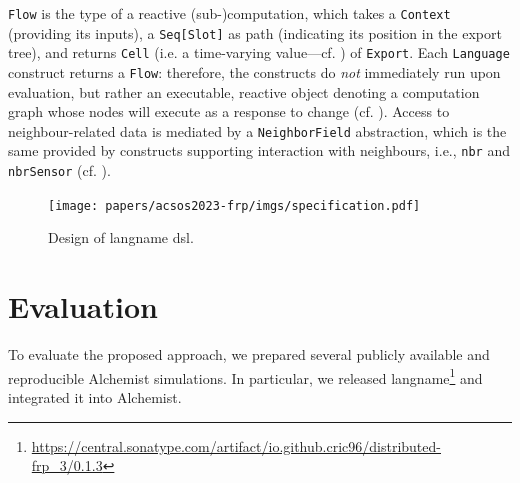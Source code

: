 \texttt{Flow} is the type 
 of a reactive \mbox{(sub-)computation},
 which takes a \texttt{Context} (providing its inputs),
 a \texttt{Seq[Slot]} as path (indicating its position in the export tree),
 and returns \texttt{Cell} (i.e. a time-varying value---cf. ) of \texttt{Export}.
%
Each \texttt{Language} construct
 returns a \texttt{Flow}:
 therefore, the constructs do \emph{not} immediately run upon evaluation,
 but rather an executable, reactive object
 denoting a computation graph
 whose nodes will execute as a response to change (cf. ).
%
Access to neighbour-related data is mediated by a \texttt{NeighborField} abstraction,
 which is the same provided by constructs
 supporting interaction with neighbours, i.e., \texttt{nbr} and \texttt{nbrSensor}
(cf. ).

\begin{figure}
\texttt{[image: papers/acsos2023-frp/imgs/specification.pdf]}
\caption{Design of \ac{langname} \ac{dsl}.}
\label{acsos2023-frp:fig:dsl-design}
\end{figure}

\section{Evaluation}
\label{acsos2023-frp:sec:eval}

%

To evaluate the proposed approach, 
 we prepared several publicly available and reproducible Alchemist simulations.
%
In particular, 
 we released \ac{langname}\footnote{\url{https://central.sonatype.com/artifact/io.github.cric96/distributed-frp_3/0.1.3}} and integrated it into Alchemist.
%

